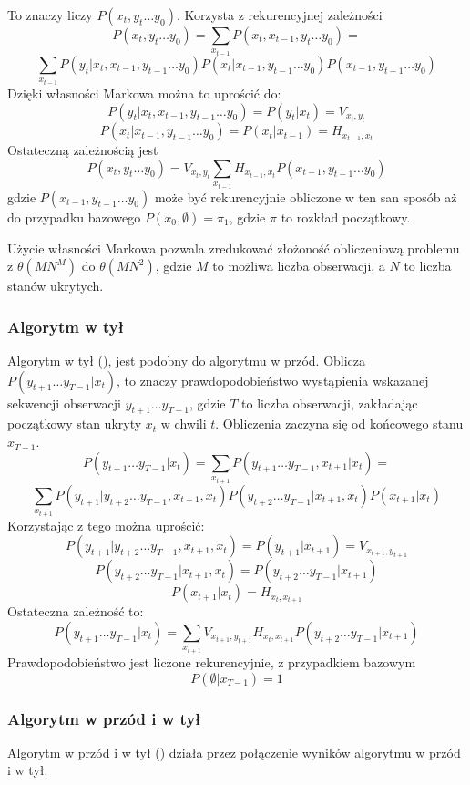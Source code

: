 To znaczy liczy $P(x_t, y_t \dots y_0)$. Korzysta z rekurencyjnej zależności
$$P(x_t, y_t \dots y_0) = \sum_{x_{t-1}} P(x_t, x_{t-1}, y_t \dots y_0) =$$
$$\sum_{x_{t-1}} P(y_t | x_t, x_{t-1}, y_{t-1} \dots y_0) P(x_t | x_{t-1}, y_{t-1} \dots y_0) P(x_{t-1}, y_{t-1} \dots y_0)$$
Dzięki własności Markowa można to uprościć do:
$$P(y_t | x_t, x_{t-1}, y_{t-1} \dots y_0) = P(y_t | x_t) = V_{x_t, y_t}$$
$$P(x_t | x_{t-1}, y_{t-1} \dots y_0) = P(x_t | x_{t-1}) = H_{x_{t-1}, x_t}$$
Ostateczną zależnością jest
$$P(x_t, y_t \dots y_0) = V_{x_t, y_t} \sum_{x_{t-1}} H_{x_{t-1}, x_t} P(x_{t-1}, y_{t-1} \dots y_0)$$
gdzie $P(x_{t-1}, y_{t-1} \dots y_0)$ może być rekurencyjnie obliczone w ten san sposób aż do przypadku bazowego $P(x_0, \emptyset) = \pi_1$, gdzie $\pi$ to rozkład początkowy.

Użycie własności Markowa pozwala zredukować złożoność obliczeniową problemu z $\theta(MN^M)$ do $\theta(MN^2)$, gdzie $M$ to możliwa liczba obserwacji, a $N$ to liczba stanów ukrytych.

\subsubsection{Algorytm w tył}

Algorytm w tył (), jest podobny do algorytmu w przód. Oblicza $P(y_{t+1} \dots y_{T-1} | x_t)$, to znaczy prawdopodobieństwo wystąpienia wskazanej sekwencji obserwacji $y_{t+1} \dots y_{T-1}$, gdzie $T$ to liczba obserwacji, zakładając początkowy stan ukryty $x_t$ w chwili $t$. Obliczenia zaczyna się od końcowego stanu $x_{T-1}$.
$$P(y_{t+1} \dots y_{T-1} | x_t) = \sum_{x_{t+1}} P(y_{t+1} \dots y_{T-1}, x_{t+1} | x_t) =$$
$$\sum_{x_{t+1}} P(y_{t+1} | y_{t+2} \dots y_{T-1}, x_{t+1}, x_t) P(y_{t+2} \dots y_{T-1} | x_{t+1}, x_t) P(x_{t+1} | x_t)$$
Korzystając z tego można uprościć:
$$P(y_{t+1} | y_{t+2} \dots y_{T-1}, x_{t+1}, x_t) = P(y_{t+1} | x_{t+1}) = V_{x_{t+1},y_{t+1}}$$
$$P(y_{t+2} \dots y_{T-1} | x_{t+1}, x_t) = P(y_{t+2} \dots y_{T-1} | x_{t+1})$$
$$P(x_{t+1} | x_t) = H_{x_t,x_{t+1}}$$
Ostateczna zależność to:
$$P(y_{t+1} \dots y_{T-1} | x_t) =  \sum_{x_{t+1}} V_{x_{t+1},y_{t+1}} H_{x_t,x_{t+1}} P(y_{t+2} \dots y_{T-1} | x_{t+1})$$
Prawdopodobieństwo jest liczone rekurencyjnie, z przypadkiem bazowym
$$P(\emptyset | x_{T-1}) = 1$$

\subsubsection{Algorytm w przód i w tył}
Algorytm w przód i w tył () działa przez połączenie wyników algorytmu w przód i w tył.

